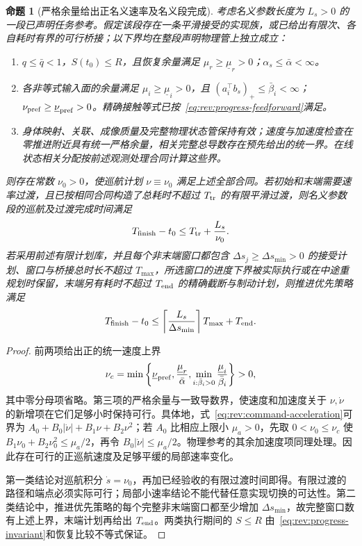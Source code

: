 \documentclass[11pt,a4paper]{article}
\numberwithin{equation}{section}
\newtheorem{proposition}[theorem]{命题}
\theoremstyle{definition}
\begin{document}
\begin{proposition}[严格余量给出正名义速率及名义段完成]
\label{prop:rev:finite-progress}
考虑名义参数长度为 $L_s>0$ 的一段已声明任务参考。假定该段存在一条平滑接受的实现族，或已给出有限次、各自耗时有界的可行桥接；以下界均在整段声明物理管上独立成立：
\begin{enumerate}
 \item $q\le\bar q<1$，$S(t_0)\le R$，且恢复余量满足 $\mu_r\ge\underline\mu_r>0$；$\alpha_s\le\bar\alpha<\infty$。
 \item 各非等式输入面的余量满足 $\mu_i\ge\underline\mu_i>0$，且 $(a_i^\top b_s)_+\le\bar\beta_i<\infty$；$\nu_{\rm pref}\ge\underline{\nu}_{\mathrm{pref}}>0$。精确接触等式已按~\eqref{eq:rev:progress-feedforward}满足。
 \item 身体映射、关联、成像质量及完整物理状态管保持有效；速度与加速度检查在零推进附近具有统一严格余量，相关完整总导数存在预先给出的统一界。在线状态相关分配按前述观测处理合同计算这些界。
\end{enumerate}
则存在常数 $\nu_0>0$，使巡航计划 $\nu\equiv\nu_0$ 满足上述全部合同。若初始和末端需要速率过渡，且已按相同合同构造了总耗时不超过 $T_{\rm tr}$ 的有限平滑过渡，则名义参数段的巡航及过渡完成时间满足
\begin{equation}
 T_{\rm finish}-t_0\le T_{\rm tr}+\frac{L_s}{\nu_0}.
 \label{eq:rev:finite-progress-time}
\end{equation}
若采用前述有限计划库，并且每个非末端窗口都包含 $\Delta s_j\ge\Delta s_{\min}>0$ 的接受计划、窗口与桥接总时长不超过 $T_{\max}$，所选窗口的进度下界被实际执行或在中途重规划时保留，末端另有耗时不超过 $T_{\rm end}$ 的精确截断与制动计划，则推进优先策略满足
\begin{equation}
 T_{\rm finish}-t_0\le
 \left\lceil\frac{L_s}{\Delta s_{\min}}\right\rceil T_{\max}+T_{\rm end}.
 \label{eq:rev:finite-window-progress}
\end{equation}
\end{proposition}
\begin{proof}
前两项给出正的统一速度上界
\[
 \nu_c=\min\left\{\underline\nu_{\rm pref},
 \frac{\underline\mu_r}{\bar\alpha},
 \min_{i:\bar\beta_i>0}\frac{\underline\mu_i}{\bar\beta_i}\right\}>0,
\]
其中零分母项省略。第三项的严格余量与一致导数界，使速度和加速度关于 $\nu,\dot\nu$ 的新增项在它们足够小时保持可行。具体地，式~\eqref{eq:rev:command-acceleration}可界为 $A_0+B_0|\dot\nu|+B_1\nu+B_2\nu^2$；若 $A_0$ 比相应上限小 $\mu_a>0$，先取 $0<\nu_0\le\nu_c$ 使 $B_1\nu_0+B_2\nu_0^2\le\mu_a/2$，再令 $B_0|\dot\nu|\le\mu_a/2$。物理参考的其余加速度项同理处理。因此存在可行的正巡航速度及足够平缓的局部速率变化。

第一类结论对巡航积分 $\dot s=\nu_0$，再加已经验收的有限过渡时间即得。有限过渡的路径和端点必须实际可行；局部小速率结论不能代替任意实现切换的可达性。第二类结论中，推进优先策略的每个完整非末端窗口都至少增加 $\Delta s_{\min}$，故完整窗口数有上述上界，末端计划再给出 $T_{\rm end}$。两类执行期间的 $S\le R$ 由~\eqref{eq:rev:progress-invariant}和恢复比较不等式保证。
\end{proof}
\end{document}
